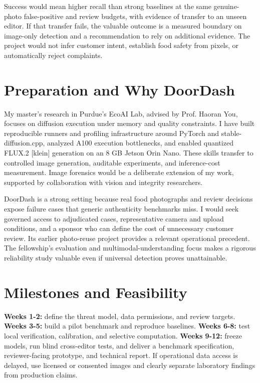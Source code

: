 \documentclass{article}
\begin{document}
Success would mean higher recall than strong baselines at the same genuine-photo false-positive and review budgets, with evidence of transfer to an unseen editor. If that transfer fails, the valuable outcome is a measured boundary on image-only detection and a recommendation to rely on additional evidence. The project would not infer customer intent, establish food safety from pixels, or automatically reject complaints.

\section{Preparation and Why DoorDash}
My master's research in Purdue's EcoAI Lab, advised by Prof. Haoran You, focuses on diffusion execution under memory and quality constraints. I have built reproducible runners and profiling infrastructure around PyTorch and stable-diffusion.cpp, analyzed A100 execution bottlenecks, and enabled quantized FLUX.2 [klein] generation on an 8 GB Jetson Orin Nano. These skills transfer to controlled image generation, auditable experiments, and inference-cost measurement. Image forensics would be a deliberate extension of my work, supported by collaboration with vision and integrity researchers.

DoorDash is a strong setting because real food photographs and review decisions expose failure cases that generic authenticity benchmarks miss. I would seek governed access to adjudicated cases, representative camera and upload conditions, and a sponsor who can define the cost of unnecessary customer review. Its earlier photo-reuse project provides a relevant operational precedent.~\citep{doordashPhotoReuse2024} The fellowship's evaluation and multimodal-understanding focus makes a rigorous reliability study valuable even if universal detection proves unattainable.

\section{Milestones and Feasibility}
\textbf{Weeks 1-2:} define the threat model, data permissions, and review targets. \textbf{Weeks 3-5:} build a pilot benchmark and reproduce baselines. \textbf{Weeks 6-8:} test local verification, calibration, and selective computation. \textbf{Weeks 9-12:} freeze models, run blind cross-editor tests, and deliver a benchmark specification, reviewer-facing prototype, and technical report. If operational data access is delayed, use licensed or consented images and clearly separate laboratory findings from production claims.
\end{document}
